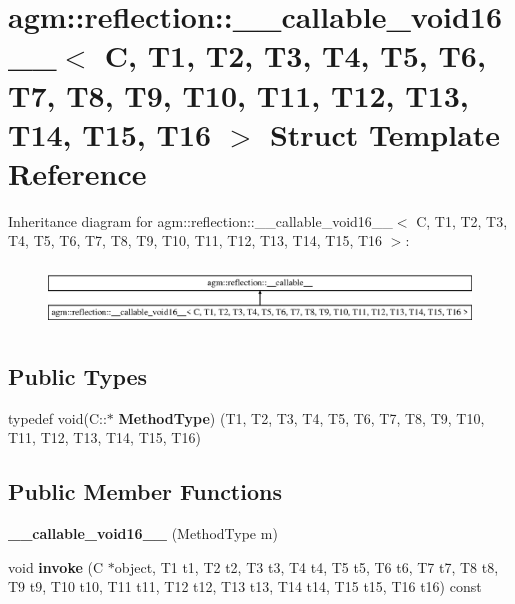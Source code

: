 \hypertarget{structagm_1_1reflection_1_1____callable__void16____}{}\section{agm\+:\+:reflection\+:\+:\+\_\+\+\_\+callable\+\_\+void16\+\_\+\+\_\+$<$ C, T1, T2, T3, T4, T5, T6, T7, T8, T9, T10, T11, T12, T13, T14, T15, T16 $>$ Struct Template Reference}
\label{structagm_1_1reflection_1_1____callable__void16____}
Inheritance diagram for agm\+:\+:reflection\+:\+:\+\_\+\+\_\+callable\+\_\+void16\+\_\+\+\_\+$<$ C, T1, T2, T3, T4, T5, T6, T7, T8, T9, T10, T11, T12, T13, T14, T15, T16 $>$\+:\begin{figure}[H]
\begin{center}
\leavevmode
\includegraphics[height=1.659259cm]{structagm_1_1reflection_1_1____callable__void16____}
\end{center}
\end{figure}
\subsection*{Public Types}
\begin{DoxyCompactItemize}
\item 
typedef void(C\+::$\ast$ {\bfseries Method\+Type}) (T1, T2, T3, T4, T5, T6, T7, T8, T9, T10, T11, T12, T13, T14, T15, T16)\hypertarget{structagm_1_1reflection_1_1____callable__void16_____a0202cf4a0fb59541db8151611df02aaf}{}\label{structagm_1_1reflection_1_1____callable__void16_____a0202cf4a0fb59541db8151611df02aaf}

\end{DoxyCompactItemize}
\subsection*{Public Member Functions}
\begin{DoxyCompactItemize}
\item 
{\bfseries \+\_\+\+\_\+callable\+\_\+void16\+\_\+\+\_\+} (Method\+Type m)\hypertarget{structagm_1_1reflection_1_1____callable__void16_____a349c36e9830a798c78248815eb206289}{}\label{structagm_1_1reflection_1_1____callable__void16_____a349c36e9830a798c78248815eb206289}

\item 
void {\bfseries invoke} (C $\ast$object, T1 t1, T2 t2, T3 t3, T4 t4, T5 t5, T6 t6, T7 t7, T8 t8, T9 t9, T10 t10, T11 t11, T12 t12, T13 t13, T14 t14, T15 t15, T16 t16) const \hypertarget{structagm_1_1reflection_1_1____callable__void16_____a0be26c345e9bede42b18bcb3c10359f5}{}\label{structagm_1_1reflection_1_1____callable__void16_____a0be26c345e9bede42b18bcb3c10359f5}

\end{DoxyCompactItemize}
